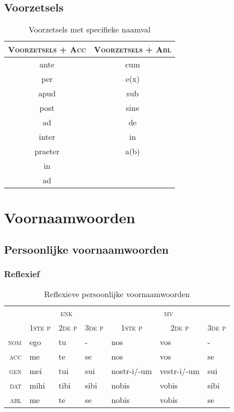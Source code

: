 \documentclass[12pt,a4paper]{article}
\begin{document}
\subsection{Voorzetsels}

\begin{table}[H]
\centering
\begin{tabular}{ c | c }
\toprule
\textsc{Voorzetsels + Acc} & \textsc{Voorzetsels + Abl} \\
\midrule
ante    & cum \\
per     & e(x) \\
apud    & sub \\
post    & sine \\
ad      & de \\
inter   & in \\
praeter & a(b) \\
in      & \\
ad      & \\
\bottomrule
\end{tabular}
\caption{Voorzetsels met specifieke naamval}
\label{tab:voorz}
\end{table}


\section{Voornaamwoorden}

\subsection{Persoonlijke voornaamwoorden}

\subsubsection{Reflexief}

\begin{table}[H]
\centering
\begin{tabular}{ r | l l l | l l l }
\toprule
 & \multicolumn{3}{c|}{\textsc{enk}} & \multicolumn{3}{c}{\textsc{mv}} \\
 & \multicolumn{1}{c}{\textsc{1ste p}} & \multicolumn{1}{c}{\textsc{2de p}} & \multicolumn{1}{c|}{\textsc{3de p}} & \multicolumn{1}{c}{\textsc{1ste p}} & \multicolumn{1}{c}{\textsc{2de p}} & \multicolumn{1}{c}{\textsc{3de p}} \\ 
\midrule
\textsc{nom} & ego  & tu   & -    & nos         & vos          & - \\
\textsc{acc} & me   & te   & se   & nos         & vos          & se \\
\textsc{gen} & mei  & tui  & sui  & nostr-i/-um & vestr-i/-um  & sui \\
\textsc{dat} & mihi & tibi & sibi & nobis       & vobis        & sibi \\
\textsc{abl} & me   & te   & se   & nobis       & vobis        & se \\
\bottomrule
\end{tabular}
\caption{Reflexieve persoonlijke voornaamwoorden}
\label{tab:reflvnw}
\end{table}
\end{document}

